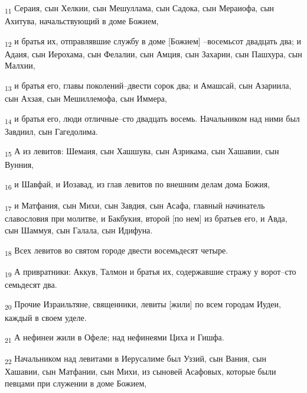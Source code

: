\begin{tcolorbox}
\textsubscript{11} Сераия, сын Хелкии, сын Мешуллама, сын Садока, сын Мераиофа, сын Ахитува, начальствующий в доме Божием,
\end{tcolorbox}
\begin{tcolorbox}
\textsubscript{12} и братья их, отправлявшие службу в доме [Божием] --восемьсот двадцать два; и Адаия, сын Иерохама, сын Фелалии, сын Амция, сын Захарии, сын Пашхура, сын Малхии,
\end{tcolorbox}
\begin{tcolorbox}
\textsubscript{13} и братья его, главы поколений--двести сорок два; и Амашсай, сын Азариила, сын Ахзая, сын Мешиллемофа, сын Иммера,
\end{tcolorbox}
\begin{tcolorbox}
\textsubscript{14} и братья его, люди отличные--сто двадцать восемь. Начальником над ними был Завдиил, сын Гагедолима.
\end{tcolorbox}
\begin{tcolorbox}
\textsubscript{15} А из левитов: Шемаия, сын Хашшува, сын Азрикама, сын Хашавии, сын Вунния,
\end{tcolorbox}
\begin{tcolorbox}
\textsubscript{16} и Шавфай, и Иозавад, из глав левитов по внешним делам дома Божия,
\end{tcolorbox}
\begin{tcolorbox}
\textsubscript{17} и Матфания, сын Михи, сын Завдия, сын Асафа, главный начинатель славословия при молитве, и Бакбукия, второй [по нем] из братьев его, и Авда, сын Шаммуя, сын Галала, сын Идифуна.
\end{tcolorbox}
\begin{tcolorbox}
\textsubscript{18} Всех левитов во святом городе двести восемьдесят четыре.
\end{tcolorbox}
\begin{tcolorbox}
\textsubscript{19} А привратники: Аккув, Талмон и братья их, содержавшие стражу у ворот--сто семьдесят два.
\end{tcolorbox}
\begin{tcolorbox}
\textsubscript{20} Прочие Израильтяне, священники, левиты [жили] по всем городам Иудеи, каждый в своем уделе.
\end{tcolorbox}
\begin{tcolorbox}
\textsubscript{21} А нефинеи жили в Офеле; над нефинеями Циха и Гишфа.
\end{tcolorbox}
\begin{tcolorbox}
\textsubscript{22} Начальником над левитами в Иерусалиме был Уззий, сын Вания, сын Хашавии, сын Матфании, сын Михи, из сыновей Асафовых, которые были певцами при служении в доме Божием,
\end{tcolorbox}
